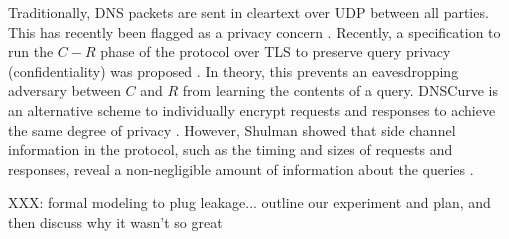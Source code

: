 \documentclass{llncs}
\begin{document}
Traditionally, DNS packets are sent in cleartext over UDP between all parties. This has
recently been flagged as a privacy concern \cite{bortzmeyer2013}. Recently, a specification to run the
$C-R$ phase of the protocol over TLS to preserve query privacy (confidentiality) was
proposed \cite{dnstls}. In theory, this prevents an eavesdropping adversary between $C$ and $R$ from
learning the contents of a query. DNSCurve is an alternative scheme to individually encrypt
requests and responses to achieve the same degree of privacy \cite{dnscurve}. However,
Shulman showed that side channel information in the protocol, such as the timing and sizes
of requests and responses, reveal a non-negligible amount of information about the
queries \cite{shulman}.

XXX: formal modeling to plug leakage... outline our experiment and plan, and then discuss why it wasn't so great





\medskip
\small


\end{document}
